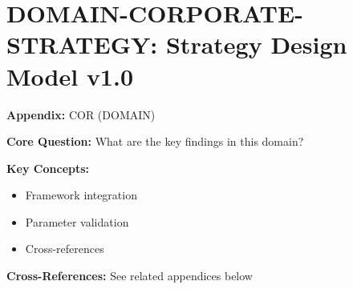 
\chapter{DOMAIN-CORPORATE-STRATEGY: Strategy Design Model v1.0}
\label{app:sdm}


\begin{tcolorbox}[colback=blue!5!white, colframe=blue!75!black,
    title=Quick Reference: Appendix COR]

\textbf{Appendix:} COR (DOMAIN)

\textbf{Core Question:} What are the key findings in this domain?

\textbf{Key Concepts:}
\begin{itemize}[nosep]
\item Framework integration
\item Parameter validation
\item Cross-references
\end{itemize}

\textbf{Cross-References:} See related appendices below
\end{tcolorbox}


\begin{abstract}
This appendix presents the Strategy Design Model v1.0 (SDM), a process-based framework for designing comprehensive corporate strategies using the EBF hybrid methodology. SDM models strategic transformation as a four-phase behavioral change journey (Awareness-Readiness-Action-Embedding) over 3-5 years, integrating five context dimensions ($\Psi$), five strategic utility dimensions (Financial, Environmental, Practical, Strategic, Deliberative), and seven complementarity parameters ($\gamma$). The model uses Behavioral Change Journey (BCJ) mathematics to predict strategy adoption probability and outcome distributions across organizational change phases. SDM is designed for large organizations facing market transformation and serves as the bridge between EBF theory and organizational practice.
\end{abstract}


